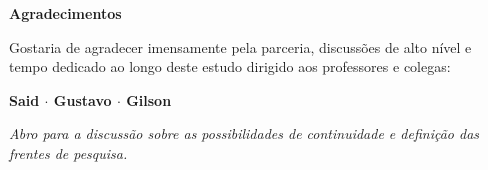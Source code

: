 \documentclass[aspectratio=169, 11pt]{beamer}
\begin{document}





\begin{frame}
    \centering
    \vspace{1cm}
    {\Large \textbf{Agradecimentos}}
    
    \vspace{0.8cm}
    \normalsize
    Gostaria de agradecer imensamente pela parceria, discussões de alto nível e tempo dedicado ao longo deste estudo dirigido aos professores e colegas:
    
    \vspace{0.5cm}
    \textbf{\Large Said $\cdot$ Gustavo $\cdot$ Gilson}
    
    \vspace{1cm}
    \small \textit{Abro para a discussão sobre as possibilidades de continuidade e definição das frentes de pesquisa.}
\end{frame}
\end{document}
